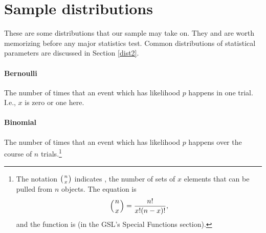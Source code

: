 \section{Sample distributions}
\label{distlist}

These are some distributions that our sample may take on. They
and are worth memorizing
before any major statistics test. Common distributions of statistical
parameters are discussed in Section \ref{dist2}.

\paragraph{Bernoulli}

The number of times that an event which has likelihood $p$ happens in
one trial. I.e., $x$ is zero or one here.

\long{}

\long{}


\paragraph{Binomial}

The number of times that an event which has likelihood $p$ happens over the
course of $n$ trials.\footnote{The notation $\left({n\atop x}\right)$ indicates
, the number of sets of $x$ elements that can be
pulled from $n$ objects. The equation is $$\left({n\atop x}\right) =
{n!\over x!(n-x)!},$$ and the function is  
(in the GSL's Special Functions section).}
 


